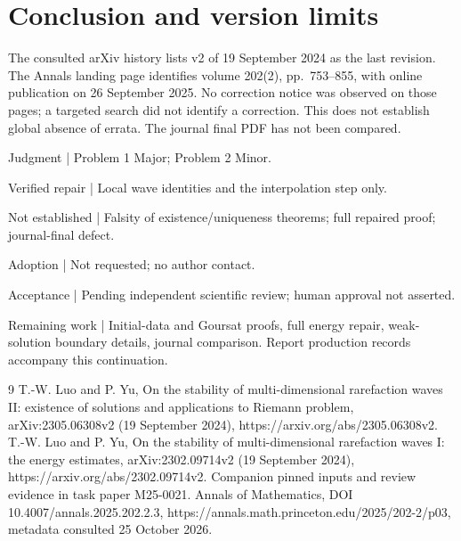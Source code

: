 \documentclass[10pt]{article}
\begin{document}
\section*{Conclusion and version limits}
The consulted arXiv history lists v2 of 19 September 2024 as the last revision. The Annals landing page identifies volume 202(2), pp. 753–855, with online publication on 26 September 2025. No correction notice was observed on those pages; a targeted search did not identify a correction. This does not establish global absence of errata. The journal final PDF has not been compared.\par
Judgment | Problem 1 Major; Problem 2 Minor.\par
Verified repair | Local wave identities and the interpolation step only.\par
Not established | Falsity of existence/uniqueness theorems; full repaired proof; journal-final defect.\par
Adoption | Not requested; no author contact.\par
Acceptance | Pending independent scientific review; human approval not asserted.\par
Remaining work | Initial-data and Goursat proofs, full energy repair, weak-solution boundary details, journal comparison. Report production records accompany this continuation.\par
9 T.-W. Luo and P. Yu, On the stability of multi-dimensional rarefaction waves II: existence of solutions and applications to Riemann problem, arXiv:2305.06308v2 (19 September 2024), https://arxiv.org/abs/2305.06308v2. T.-W. Luo and P. Yu, On the stability of multi-dimensional rarefaction waves I: the energy estimates, arXiv:2302.09714v2 (19 September 2024), https://arxiv.org/abs/2302.09714v2. Companion pinned inputs and review evidence in task paper M25-0021. Annals of Mathematics, DOI 10.4007/annals.2025.202.2.3, https://annals.math.princeton.edu/2025/202-2/p03, metadata consulted 25 October 2026.\par
\end{document}
